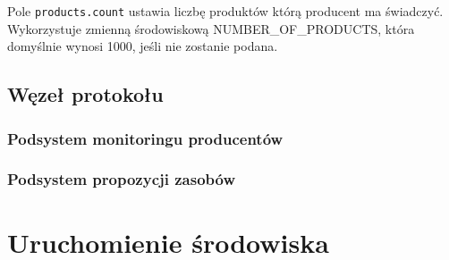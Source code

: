Pole \verb|products.count| ustawia liczbę produktów którą producent ma świadczyć. Wykorzystuje zmienną środowiskową NUMBER\_OF\_PRODUCTS, która domyślnie wynosi 1000, jeśli nie zostanie podana.

\subsection{Węzeł protokołu}
\subsubsection{Podsystem monitoringu producentów}
\subsubsection{Podsystem propozycji zasobów}

\section{Uruchomienie środowiska}